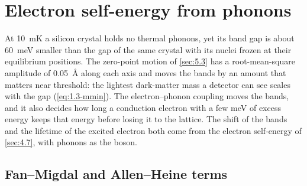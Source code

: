 \section{Electron self-energy from phonons}\label{sec:6.3}

At \SI{10}{mK} a silicon crystal holds no thermal phonons, yet its band gap is about \SI{60}{meV} smaller than the gap of the same crystal with its nuclei frozen at their equilibrium positions. The zero-point motion of \cref{sec:5.3} has a root-mean-square amplitude of \SI{0.05}{\angstrom} along each axis and moves the bands by an amount that matters near threshold: the lightest dark-matter mass a detector can see scales with the gap (\cref{eq:1.3-mmin}). The electron--phonon coupling moves the bands, and it also decides how long a conduction electron with a few meV of excess energy keeps that energy before losing it to the lattice. The shift of the bands and the lifetime of the excited electron both come from the electron self-energy of \cref{sec:4.7}, with phonons as the boson.

\subsection{Fan--Migdal and Allen--Heine terms}

